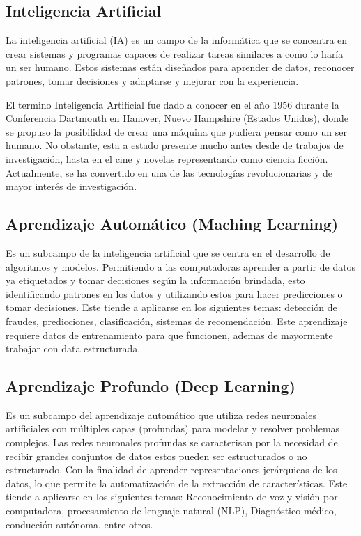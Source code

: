 

\subsection{Inteligencia Artificial}
La inteligencia artificial (IA) es un campo de la informática que se concentra en crear sistemas y programas capaces de realizar tareas similares a como lo haría un ser humano. Estos sistemas están diseñados para aprender de datos, reconocer patrones, tomar decisiones y adaptarse y mejorar con la experiencia. 

El termino Inteligencia Artificial fue dado a conocer en el año 1956 durante la Conferencia Dartmouth en Hanover, Nuevo Hampshire (Estados Unidos), donde se propuso la posibilidad de crear una máquina que pudiera pensar como un ser humano.  No obstante, esta a estado presente mucho antes desde de trabajos de investigación, hasta en el cine y novelas representando como ciencia ficción. 
Actualmente, se ha convertido en una de las tecnologías revolucionarias y de mayor interés de investigación.

\subsection{ Aprendizaje Automático  (Maching Learning)}
Es un subcampo de la inteligencia artificial que se centra en el desarrollo de algoritmos y modelos. Permitiendo a las computadoras aprender a partir de datos ya etiquetados y tomar decisiones según la información brindada, esto identificando patrones en los datos y utilizando estos para hacer predicciones o tomar decisiones.
Este tiende a aplicarse en los siguientes temas: detección de fraudes, predicciones, clasificación, sistemas de recomendación.
Este aprendizaje requiere datos de entrenamiento para que funcionen, ademas de mayormente trabajar con data estructurada.
\subsection{Aprendizaje Profundo (Deep Learning)}
Es un subcampo del aprendizaje automático que utiliza redes neuronales artificiales con múltiples capas (profundas) para modelar y resolver problemas complejos. Las redes neuronales profundas se caracterisan por la necesidad de recibir grandes conjuntos de datos estos pueden ser estructurados o no estructurado. Con la finalidad de aprender representaciones jerárquicas de los datos, lo que permite la automatización de la extracción de características.
Este tiende a aplicarse en los siguientes temas: Reconocimiento de voz y visión por computadora, procesamiento de lenguaje natural (NLP), Diagnóstico médico, conducción autónoma, entre otros.

